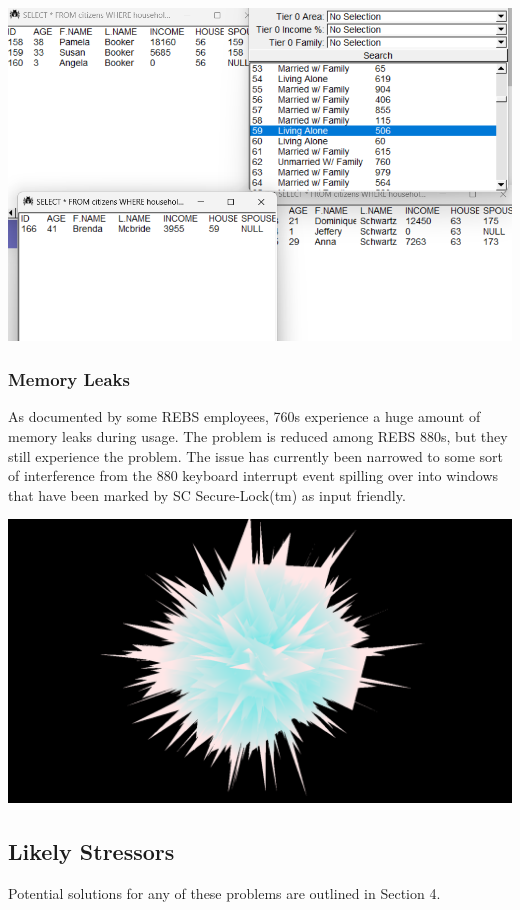 \documentclass{article}
\begin{document}
\begin{multicols}{2}
\begin{center}
\includegraphics[scale=0.25]{database.png}
\end{center}

\subsubsection{Memory Leaks}
As documented by some REBS employees, 760s experience a huge amount of memory leaks during usage. The problem is reduced among REBS 880s, but they still experience the problem. The issue has currently been narrowed to some sort of interference from the 880 keyboard interrupt event spilling over into windows that have been marked by SC Secure-Lock(tm) as input friendly.

\begin{center}
\includegraphics[scale=0.1]{AH49CI.png}
\end{center}

\subsection{Likely Stressors}
Potential solutions for any of these problems are outlined in Section 4. 


\end{multicols}
\end{document}
